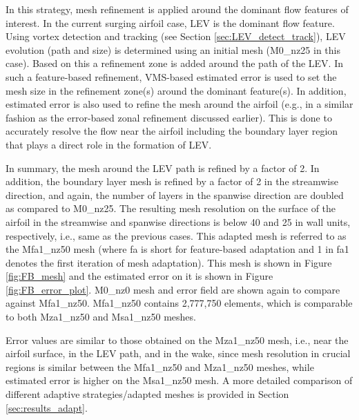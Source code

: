 In this strategy, mesh refinement is applied around the dominant flow features of interest.
In the current surging airfoil case, LEV is the dominant flow feature. 
Using vortex detection and tracking (see Section \ref{sec:LEV_detect_track}), LEV evolution (path and size) is determined using an initial mesh (M0\_nz25 in this case). 
Based on this a refinement zone is added around the path of the LEV.
In such a feature-based refinement, VMS-based estimated error is used to set the mesh size in the refinement zone(s) around the dominant feature(s). 
In addition, estimated error is also used to refine the mesh around the airfoil (e.g., in a similar fashion as the error-based zonal refinement discussed earlier). 
This is done to accurately resolve the flow near the airfoil including the boundary layer region that plays a direct role in the formation of LEV.

In summary, the mesh around the LEV path is refined by a factor of 2. In addition, the boundary layer mesh is refined by a factor of 2 in the streamwise direction, and again, the number of layers in the spanwise direction are doubled as compared to M0\_nz25.
The resulting mesh resolution on the surface of the airfoil in the streamwise and spanwise directions is below 40 and 25 in wall units, respectively, i.e., same as the previous cases.
This adapted mesh is referred to as the Mfa1\_nz50 mesh (where fa is short for feature-based adaptation and 1 in fa1 denotes the first iteration of mesh adaptation). 
This mesh is shown in Figure \ref{fig:FB_mesh} and the estimated error on it is shown in Figure \ref{fig:FB_error_plot}.
M0\_nz0 mesh and error field are shown again to compare against Mfa1\_nz50.
Mfa1\_nz50 contains 2,777,750 elements, which is comparable to both Mza1\_nz50 and Msa1\_nz50 meshes.

Error values are similar to those obtained on the Mza1\_nz50 mesh, i.e., near the airfoil surface, in the LEV path, and in the wake, since mesh resolution in crucial regions is similar between the Mfa1\_nz50 and Mza1\_nz50 meshes, while estimated error is higher on the Msa1\_nz50 mesh.
A more detailed comparison of different adaptive strategies/adapted meshes is provided in Section \ref{sec:results_adapt}.

